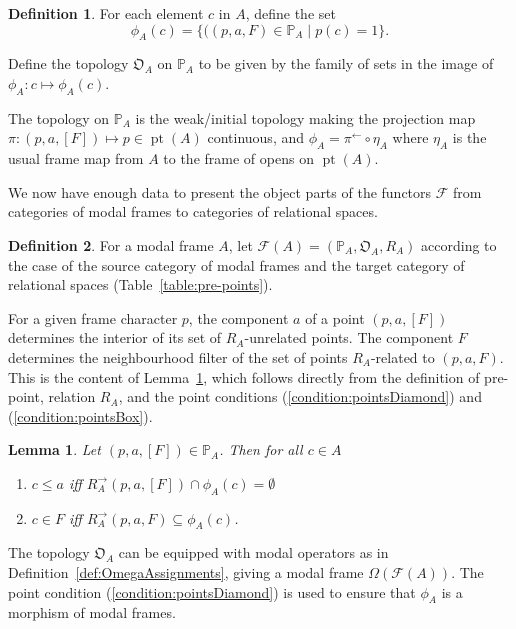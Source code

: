 \documentclass{article}[a4paper]
\newtheorem{lemma}{Lemma}%
\theoremstyle{definition}
\newtheorem{definition}{Definition}%
\newcommand{\Fcal}{\mathcal{F}} %
\newcommand{\Ofrak}{\mathfrak{O}} %
\DeclareMathOperator{\pt}{\mathrm{pt}}
\newcommand{\Pbb}{\mathbb{P}}
\newcommand{\invim}{^{\leftarrow}} %
\newcommand{\dirim}{^{\rightarrow\!}}
\begin{document}
\begin{definition}
For each element $c$ in $A$, define the set 
\begin{equation*}
    \phi_A (c) = \{ ((p,a,F) \in \Pbb_A \mid p(c)=1 \} .
\end{equation*}

Define the topology $\Ofrak _A$ on $\Pbb _A$ to be given by the family of sets in the  image of $\phi_A: c \mapsto \phi_A (c)$. 
\end{definition}

The topology on $\Pbb_A$ is the weak/initial topology making the projection map $\pi: (p,a,[F]) \mapsto p \in \pt(A)$ continuous, and $\phi_A = \pi\invim \circ \eta_A$ where $\eta_A$ is the usual frame map from $A$ to the frame of opens on $\pt{(A)}$.

We now have enough data to present the object parts of the functors $\Fcal$ from categories of modal frames to categories of relational spaces.

\begin{definition}
For a modal frame $A$, let 
$\Fcal(A) = (\Pbb _A , \Ofrak_A , R_A)$ according to the case of the source category of modal frames and the target category of relational spaces (Table~\ref{table:pre-points}). 
\end{definition}

For a given frame character $p$, the component $a$ of a point $(p,a,[F])$ determines the interior of 
its set of $R_A$-unrelated points. The component $F$ determines the 
neighbourhood filter of the set of points $R_A$-related to $(p,a,F)$. 
This is the content of Lemma~\ref{tripmot}, which follows directly from the definition of pre-point, relation $R_A$, and the point conditions (\ref{condition:pointsDiamond}) and (\ref{condition:pointsBox}). 
\begin{lemma}
\label{tripmot}
Let $(p,a,[F]) \in \Pbb _A$. Then for all $c \in A$ 
\begin{enumerate}
\item $c \leq a$ iff $R_A \dirim (p,a,[F])\cap\phi _A (c) 
= \emptyset $ 
\item $c \in  F$ iff 
$R_A \dirim (p,a,F)
\subseteq \phi _A (c)$.
\end{enumerate}
\end{lemma}

The topology $\Ofrak _A$ can be equipped with modal operators as in Definition~\ref{def:OmegaAssignments}, giving a modal frame $\Omega (\Fcal (A))$. The point condition (\ref{condition:pointsDiamond}) is used to ensure that $\phi_A$ is a morphism of modal frames.
\end{document}
